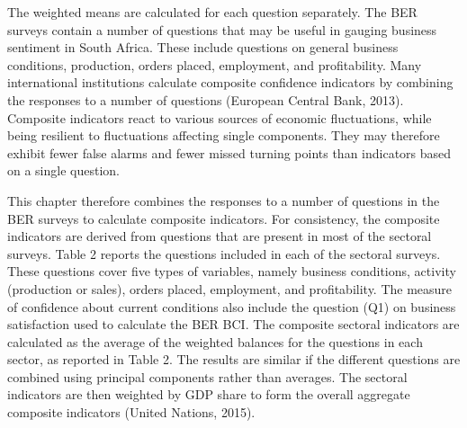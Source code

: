 \documentclass[11pt,]{article}
\begin{document}
The weighted means are calculated for each question separately. The BER
surveys contain a number of questions that may be useful in gauging
business sentiment in South Africa. These include questions on general
business conditions, production, orders placed, employment, and
profitability. Many international institutions calculate composite
confidence indicators by combining the responses to a number of
questions (European Central Bank, 2013). Composite indicators react to
various sources of economic fluctuations, while being resilient to
fluctuations affecting single components. They may therefore exhibit
fewer false alarms and fewer missed turning points than indicators based
on a single question.

This chapter therefore combines the responses to a number of questions
in the BER surveys to calculate composite indicators. For consistency,
the composite indicators are derived from questions that are present in
most of the sectoral surveys. Table 2 reports the questions included in
each of the sectoral surveys. These questions cover five types of
variables, namely business conditions, activity (production or sales),
orders placed, employment, and profitability. The measure of confidence
about current conditions also include the question (Q1) on business
satisfaction used to calculate the BER BCI. The composite sectoral
indicators are calculated as the average of the weighted balances for
the questions in each sector, as reported in Table 2. The results are
similar if the different questions are combined using principal
components rather than averages. The sectoral indicators are then
weighted by GDP share to form the overall aggregate composite indicators
(United Nations, 2015).

\begin{table}[]
\centering
\caption{Survey questions used by sector}
\end{table}
\end{document}
